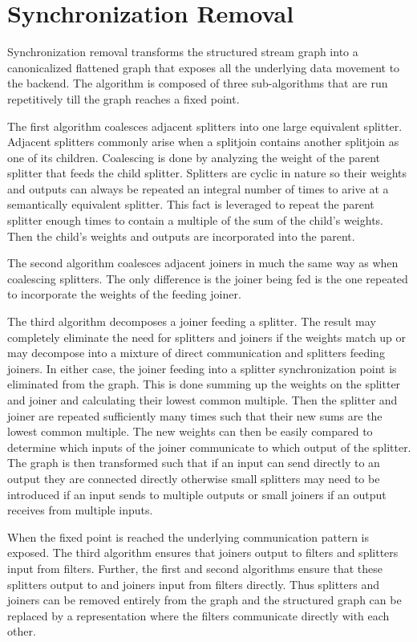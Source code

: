 \section{Synchronization Removal}
\label{sec:synchremoval}

Synchronization removal transforms the structured stream graph into a
canonicalized flattened graph that exposes all the underlying
data movement to the backend. The algorithm is composed of three
sub-algorithms that are run repetitively till the graph reaches a
fixed point.

The first algorithm coalesces adjacent splitters into one large
equivalent splitter. Adjacent splitters commonly arise when a
splitjoin contains another splitjoin as one of its
children. Coalescing is done by analyzing the weight of the parent
splitter that feeds the child splitter. Splitters are cyclic in nature
so their weights and outputs can always be repeated an integral number
of times to arive at a semantically equivalent splitter. This fact is
leveraged to repeat the parent splitter enough times to contain a
multiple of the sum of the child's weights. Then the child's weights
and outputs are incorporated into the parent.

The second algorithm coalesces adjacent joiners in much the same way
as when coalescing splitters. The only difference is the joiner being
fed is the one repeated to incorporate the weights of the feeding joiner.

The third algorithm decomposes a joiner feeding a splitter. The result
may completely eliminate the need for splitters and joiners if the weights
match up or may decompose into a mixture of direct communication and
splitters feeding joiners. In either case, the joiner feeding into a
splitter synchronization point is eliminated from the graph. This is
done summing up the weights on the splitter and joiner and calculating
their lowest common multiple. Then the splitter and joiner are
repeated sufficiently many times such that their new sums are the lowest
common multiple. The new weights can then be easily compared to
determine which inputs of the joiner communicate to which output of
the splitter. The graph is then transformed such that if an input can
send directly to an output they are connected directly otherwise small
splitters may need to be introduced if an input sends to multiple
outputs or small joiners if an output receives from multiple inputs.

When the fixed point is reached the underlying communication pattern
is exposed. The third algorithm ensures that joiners output to filters
and splitters input from filters. Further, the first and second
algorithms ensure that these splitters output to and joiners input
from filters directly. Thus splitters and joiners can be removed
entirely from the graph and the structured graph can be replaced by a
representation where the filters communicate directly with each other.